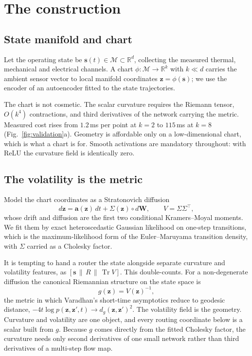 \documentclass[11pt]{article}
\newcommand{\Trr}{\operatorname{Tr}}
\newcommand{\M}{\mathcal{M}}
\newcommand{\s}{\bm{s}}
\newcommand{\z}{\bm{z}}
\begin{document}
\section{The construction}
\label{sec:theory}

\subsection{State manifold and chart}

Let the operating state be $\s(t)\in\M\subset\mathbb{R}^d$, collecting the
measured thermal, mechanical and electrical channels. A chart
$\phi:\M\to\mathbb{R}^k$ with $k\ll d$ carries the ambient sensor vector to
local manifold coordinates $\z=\phi(\s)$; we use the encoder of an
autoencoder fitted to the state trajectories.

The chart is not cosmetic. The scalar curvature requires the Riemann tensor,
$O(k^4)$ contractions, and third derivatives of the network carrying the
metric. Measured cost rises from $1.2$\,ms per point at $k=2$ to $115$\,ms at
$k=8$ (Fig.~\ref{fig:validation}a). Geometry is affordable only on a
low-dimensional chart, which is what a chart is for. Smooth activations are
mandatory throughout: with ReLU the curvature field is identically zero.

\subsection{The volatility is the metric}

Model the chart coordinates as a Stratonovich diffusion
\begin{equation}
  d\z = \bm{a}(\z)\,dt + \Sigma(\z)\circ d\bm{W},
  \qquad V=\Sigma\Sigma^{\!\top},
  \label{eq:sde}
\end{equation}
whose drift and diffusion are the first two conditional Kramers--Moyal moments.
We fit them by exact heteroscedastic Gaussian likelihood on one-step
transitions, which is the maximum-likelihood form of the Euler--Maruyama
transition density, with $\Sigma$ carried as a Cholesky factor.

It is tempting to hand a router the state alongside separate curvature and
volatility features, as $[\s \,\|\, R \,\|\, \Trr V]$. This double-counts. For a
non-degenerate diffusion the canonical Riemannian structure on the state space
is
\begin{equation}
  g(\z) = V(\z)^{-1},
  \label{eq:metric}
\end{equation}
the metric in which Varadhan's short-time asymptotics reduce to geodesic
distance, $-4t\log p(\z,\z',t)\to d_g(\z,\z')^{2}$. The volatility field is the
geometry. Curvature and volatility are one object, and every routing coordinate
below is a scalar built from $g$. Because $g$ comes directly from the fitted
Cholesky factor, the curvature needs only second derivatives of one small
network rather than third derivatives of a multi-step flow map.
\end{document}
